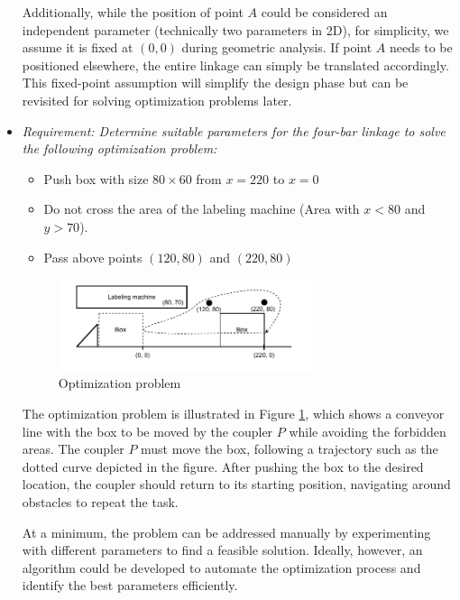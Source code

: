 \documentclass{article}
\begin{document}
\begin{itemize}
	Additionally, while the position of point $A$ could be considered an independent parameter (technically two parameters in 2D), for simplicity, we assume it is fixed at $(0, 0)$ during geometric analysis. If point $A$ needs to be positioned elsewhere, the entire linkage can simply be translated accordingly. This fixed-point assumption will simplify the design phase but can be revisited for solving optimization problems later.
	
	\item \textit{Requirement: Determine suitable parameters for the four-bar linkage to solve the following optimization problem:}
	\begin{itemize}
		\item Push box with size $80\times60$ from $x=220$ to $x=0$
		\item Do not cross the area of the labeling machine (Area with $x<80$ and $y>70$).
		\item Pass above points $(120, 80)$ and $(220, 80)$
	\end{itemize}
	
	\begin{figure}[h]
		\centering
		\includegraphics[width=0.7\textwidth]{./figures/optimization_problem_task.pdf}
		\caption{Optimization problem}
		\label{fig:optimization_problem}
	\end{figure}
	
	The optimization problem is illustrated in Figure  \ref{fig:optimization_problem}, which shows a conveyor line with the box to be moved by the coupler $P$ while avoiding the forbidden areas. The coupler $P$ must move the box, following a trajectory such as the dotted curve depicted in the figure. After pushing the box to the desired location, the coupler should return to its starting position, navigating around obstacles to repeat the task.
	
	At a minimum, the problem can be addressed manually by experimenting with different parameters to find a feasible solution. Ideally, however, an algorithm could be developed to automate the optimization process and identify the best parameters efficiently.
\end{itemize}
\end{document}
